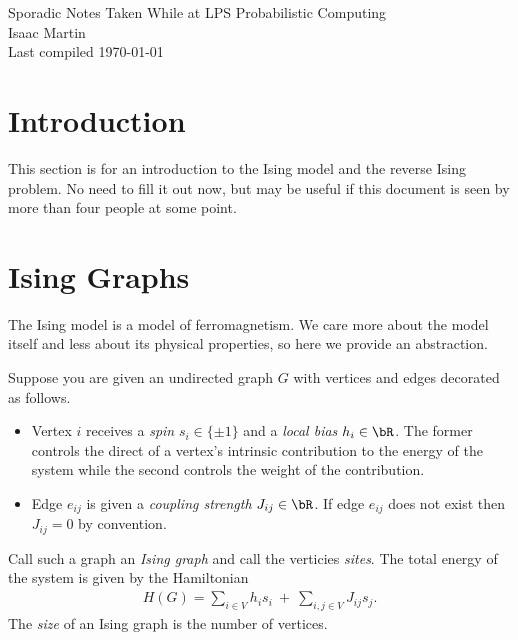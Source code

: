 


\pagestyle{empty}
	\LARGE
\begin{center}
	Sporadic Notes Taken While at LPS Probabilistic Computing \\
	\Large
	Isaac Martin \\
    Last compiled \today
\end{center}
\normalsize
\vspace{-2mm}
\hru
\tableofcontents

\section{Introduction}
This section is for an introduction to the Ising model and the reverse Ising problem. No need to fill it out now, but may be useful if this document is seen by more than four people at some point.
\begin{comment}
	The \textbf{forward Ising problem} takes as input the values of the local biases $\{h_i\}$ and the coupling strengths $\{J_{ij}\}$ and then outputs the (or rather, ``a'') tuple $(s_1,...,s_n)$ of spins which minimize the Hamiltonian.

	The \textbf{reverse Ising problem} takes as input a tuple of spins and then outputs the set of $h_{i}$ and $J_{ij}$ which minimize the Hamiltonian, if possible. It is of interest as a slight modification of this problem would allow for the construction of logic gates from Ising graphs, in which a spin value of $1$ and $-1$ represent true and false respectively.
\end{comment}

\section{Ising Graphs}
The Ising model is a model of ferromagnetism. We care more about the model itself and less about its physical properties, so here we provide an abstraction. 
\begin{defn}\label{defn:ising-graph}
	Suppose you are given an undirected graph $G$ with vertices and edges decorated as follows. 
	\begin{itemize}
			\item Vertex $i$ receives a \emph{spin} $s_i \in \{\pm 1\}$ and a \emph{local bias} $h_i \in \bR$. The former controls the direct of a vertex's intrinsic contribution to the energy of the system while the second controls the weight of the contribution.
			\item Edge $e_{ij}$ is given a \emph{coupling strength} $J_{ij} \in \bR$. If edge $e_{ij}$ does not exist then $J_{ij} = 0$ by convention.
	\end{itemize}
	Call such a graph an \emph{Ising graph} and call the verticies \emph{sites}. The total energy of the system is given by the Hamiltonian
	\begin{align*}
		H(G) = \sum_{i \in V} h_is_i ~+~ \sum_{i,j \in V} J_{ij}s_j.
	\end{align*}
	The \emph{size} of an Ising graph is the number of vertices.
\end{defn}

